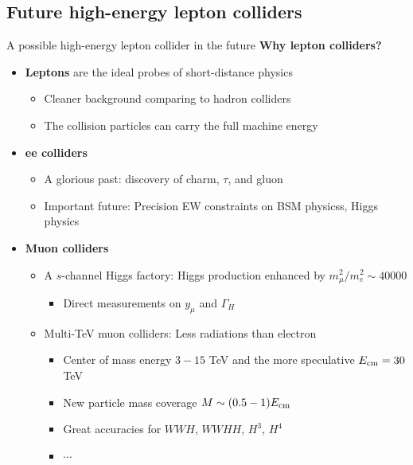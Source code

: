 \documentclass[aspectratio=169]{beamer}
\begin{document}
\subsection{Future high-energy lepton colliders}
\begin{frame}{A possible high-energy lepton collider in the future}
	\textcolor{PittRoyal}{{\bf Why lepton colliders?}}
	\begin{itemize}
	\item \textcolor{PittRoyal}{{\bf Leptons} are the ideal probes of short-distance physics}
	\begin{itemize}
		\item Cleaner background comparing to hadron colliders
		\item The collision particles can carry the full machine energy
	\end{itemize}
	\item \textcolor{PittRoyal}{{\bf ee colliders}}
	\begin{itemize}
		\item A glorious past: discovery of charm, $\tau$, and gluon 
		\item Important future: Precision EW constraints on BSM physicss, Higgs physics
	\end{itemize}
	\item \textcolor{PittRoyal}{{\bf Muon colliders}}
	\begin{itemize}
		\item \textcolor{PittRoyal}{A $s$-channel Higgs factory}: Higgs production enhanced by $m_\mu^2/m_e^2\sim 40000$
		\begin{itemize}
			\item Direct measurements on $y_\mu$ and $\Gamma_H$
		\end{itemize}
		\item \textcolor{PittRoyal}{Multi-TeV muon colliders}: Less radiations than electron
		\begin{itemize}
			\item Center of mass energy $3 -15$ TeV and the more speculative $E_{\rm cm}=30$ TeV
			\item New particle mass coverage $M \sim (0.5 - 1 ) E_{\rm cm}$
			\item Great accuracies for $WWH$, $WWHH$, $H^3$, $H^4$
			\item $\cdots$
		\end{itemize}
	\end{itemize}
	\end{itemize}
\end{frame}
\end{document}
